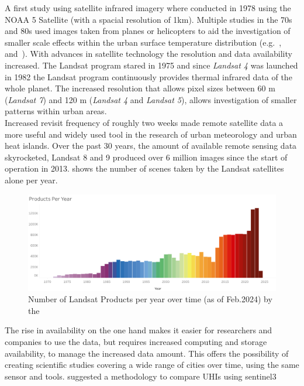 \documentclass[a4paper, english]{article}
\begin{document}
  A first study using satellite infrared imagery where conducted in 1978 using the NOAA 5 Satellite (with a spacial resolution of 1km)\cite{Matson1978}. 
  Multiple studies in the 70s and 80s used images taken from planes or helicopters to aid the investigation of smaller scale effects within the urban surface temperature distribution (e.g.~\cite{Landsberg1979},~\cite{ljungberg1980use} and~\cite{Foster1981}).
  With advances in satellite technology the resolution and data availability increased. 
  The Landsat program stared in 1975 and since \textit{Landsat 4} was launched in 1982 the Landsat program continuously provides thermal infrared data of the whole planet. 
  The increased resolution that allows pixel sizes between 60 m (\textit{Landsat 7}) and 120 m (\textit{Landsat 4} and \textit{Landsat 5}), allows investigation of smaller patterns within urban areas.\\
  Increased revisit frequency of roughly two weeks made remote satellite data a more useful and widely used tool in the research of urban meteorology and urban heat islands. 
  Over the past 30 years, the amount of available remote sensing data skyrocketed, Landsat 8 and 9 produced over 6 million images since the start of operation in 2013.  shows the number of scenes taken by the Landsat satellites alone per year.
  \begin{figure}[!htbp]
    \centering
    \includegraphics[width=\textwidth]{img/LandsatDataArchiveStatsProductsPerYear.png}
    \caption{Number of Landsat Products per year over time (as of Feb.2024) by the~\cite{landsatstats}\label{fig:landsatproductsovertime}}
  \end{figure}
  The rise in availability on the one hand makes it easier for researchers and companies to use the data, but requires increased computing and storage availability, to manage the increased data amount.
  This offers the possibility of creating scientific studies covering a wide range of cities over time, using the same sensor and tools. 
  \Cite{Sobrino2020} suggested a methodology to compare \glspl{UHI} using \gls{sentinel3}
  
\end{document}
